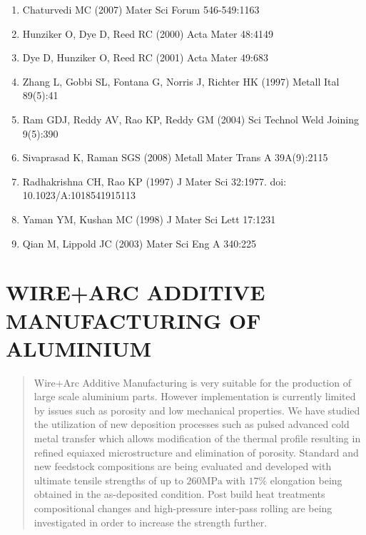 \documentclass[10pt]{article}
\begin{document}
\begin{enumerate}
  \item Chaturvedi MC (2007) Mater Sci Forum 546-549:1163

  \item Hunziker O, Dye D, Reed RC (2000) Acta Mater 48:4149

  \item Dye D, Hunziker O, Reed RC (2001) Acta Mater 49:683

  \item Zhang L, Gobbi SL, Fontana G, Norris J, Richter HK (1997) Metall Ital 89(5):41

  \item Ram GDJ, Reddy AV, Rao KP, Reddy GM (2004) Sci Technol Weld Joining 9(5):390

  \item Sivaprasad K, Raman SGS (2008) Metall Mater Trans A 39A(9):2115

  \item Radhakrishna CH, Rao KP (1997) J Mater Sci 32:1977. doi: 10.1023/A:1018541915113

  \item Yaman YM, Kushan MC (1998) J Mater Sci Lett 17:1231

  \item Qian M, Lippold JC (2003) Mater Sci Eng A 340:225

\end{enumerate}

\section*{WIRE+ARC ADDITIVE MANUFACTURING OF ALUMINIUM }


\begin{abstract}
Wire+Arc Additive Manufacturing is very suitable for the production of large scale aluminium parts. However implementation is currently limited by issues such as porosity and low mechanical properties. We have studied the utilization of new deposition processes such as pulsed advanced cold metal transfer which allows modification of the thermal profile resulting in refined equiaxed microstructure and elimination of porosity. Standard and new feedstock compositions are being evaluated and developed with ultimate tensile strengths of up to $260 \mathrm{MPa}$ with $17 \%$ elongation being obtained in the as-deposited condition. Post build heat treatments compositional changes and high-pressure inter-pass rolling are being investigated in order to increase the strength further.
\end{abstract}
\end{document}

